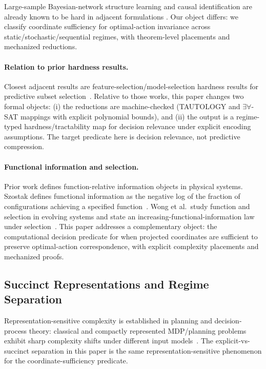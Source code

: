 Large-sample Bayesian-network structure learning and causal identification are already known to be hard in adjacent formulations \cite{chickering2004large,shpitser2006identification,koller2009probabilistic}. Our object differs: we classify coordinate sufficiency for optimal-action invariance across static/stochastic/sequential regimes, with theorem-level placements and mechanized reductions.

\paragraph{Relation to prior hardness results.}
Closest adjacent results are feature-selection/model-selection hardness results for predictive subset selection~\cite{blum1997selection, amaldi1998complexity}. Relative to those works, this paper changes two formal objects: (i) the reductions are machine-checked (TAUTOLOGY and $\exists\forall$-SAT mappings with explicit polynomial bounds), and (ii) the output is a regime-typed hardness/tractability map for decision relevance under explicit encoding assumptions. The target predicate here is decision relevance, not predictive compression.

\paragraph{Functional information and selection.}
Prior work defines function-relative information objects in physical systems. Szostak defines functional information as the negative log of the fraction of configurations achieving a specified function~\cite{szostak2003functional}. Wong et al.\ study function and selection in evolving systems and state an increasing-functional-information law under selection~\cite{wong2023roles}. This paper addresses a complementary object: the computational decision predicate for when projected coordinates are sufficient to preserve optimal-action correspondence, with explicit complexity placements and mechanized proofs.

\subsection{Succinct Representations and Regime Separation}

Representation-sensitive complexity is established in planning and decision-process theory: classical and compactly represented MDP/planning problems exhibit sharp complexity shifts under different input models~\cite{papadimitriou1987mdp,mundhenk2000mdp,littman1998probplanning}. The explicit-vs-succinct separation in this paper is the same representation-sensitive phenomenon for the coordinate-sufficiency predicate.


